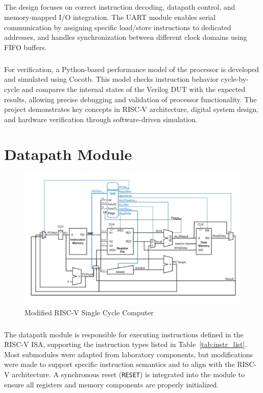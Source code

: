 \documentclass[12pt]{report}
\begin{document}
\paragraph{}
The design focuses on correct instruction decoding, datapath control, and memory-mapped I/O integration. The UART module enables serial communication by assigning specific load/store instructions to dedicated addresses, and handles synchronization between different clock domains using FIFO buffers.

\paragraph{}
For verification, a Python-based performance model of the processor is developed and simulated using Cocotb. This model checks instruction behavior cycle-by-cycle and compares the internal states of the Verilog DUT with the expected results, allowing precise debugging and validation of processor functionality. The project demonstrates key concepts in RISC-V architecture, digital system design, and hardware verification through software-driven simulation.





\chapter{Datapath Module}
\begin{figure}[h]
    \centering
    \includegraphics[width=\textwidth]{figures/datapath_flow.jpeg}
    \caption{Modified RISC-V Single Cycle Computer}
    \label{fig:datapath}
\end{figure}

\paragraph{}
The datapath module is responsible for executing instructions defined in the RISC-V ISA, supporting the instruction types listed in Table~\ref{tab:instr_list}. Most submodules were adapted from laboratory components, but modifications were made to support specific instruction semantics and to align with the RISC-V architecture. A synchronous reset (\texttt{RESET}) is integrated into the module to ensure all registers and memory components are properly initialized.
\end{document}
